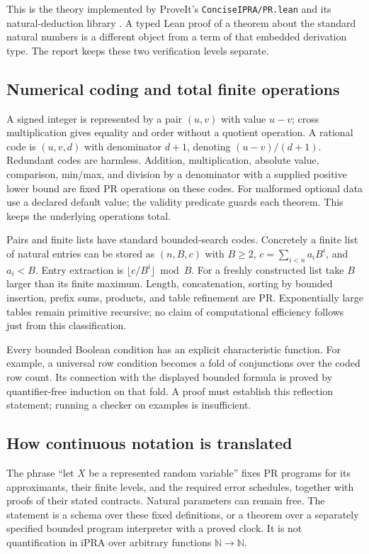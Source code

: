 This is the theory implemented by ProveIt's
\texttt{ConciseIPRA/PR.lean} and its natural-deduction library
\cite{repoCore}. A typed Lean proof of a theorem about the standard natural
numbers is a different object from a term of that embedded derivation type.
The report keeps these two verification levels separate.

\subsection{Numerical coding and total finite operations}

A signed integer is represented by a pair $(u,v)$ with value $u-v$;
cross multiplication gives equality and order without a quotient operation.
A rational code is $(u,v,d)$ with denominator $d+1$, denoting
$(u-v)/(d+1)$. Redundant codes are harmless. Addition, multiplication,
absolute value, comparison, min/max, and division by a denominator with a
supplied positive lower bound are fixed PR operations on these codes.
For malformed optional data use a declared default value; the validity
predicate guards each theorem. This keeps the underlying operations total.

Pairs and finite lists have standard bounded-search codes. Concretely a
finite list of natural entries can be stored as $(n,B,c)$ with $B\ge2$,
$c=\sum_{i<n}a_iB^i$, and $a_i<B$. Entry extraction is
$\lfloor c/B^i\rfloor\bmod B$. For a freshly constructed list take $B$
larger than its finite maximum. Length, concatenation, sorting by bounded
insertion, prefix sums, products, and table refinement are PR. Exponentially
large tables remain primitive recursive; no claim of computational
efficiency follows just from this classification.

Every bounded Boolean condition has an explicit characteristic function.
For example, a universal row condition becomes a fold of conjunctions over
the coded row count. Its connection with the displayed bounded formula is
proved by quantifier-free induction on that fold. A proof must establish this
reflection statement; running a checker on examples is insufficient.

\subsection{How continuous notation is translated}

The phrase ``let $X$ be a represented random variable'' fixes PR programs for
its approximants, their finite levels, and the required error schedules,
together with proofs of their stated contracts. Natural parameters can remain
free. The statement is a schema over these fixed definitions, or a theorem
over a separately specified bounded program interpreter with a proved clock.
It is not quantification in iPRA over arbitrary functions $\mathbb N\to\mathbb N$.

